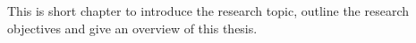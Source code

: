 This is short chapter to introduce the research topic, outline the research objectives and give an overview of this thesis.


